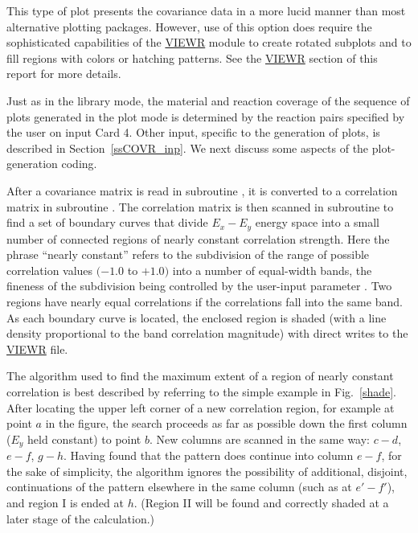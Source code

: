 This type of plot presents the covariance data in a more lucid manner
than most alternative plotting packages.  However, use of this option
does require the sophisticated capabilities of the
\hyperlink{sVIEWRhy}{VIEWR}
module to create rotated subplots and to fill regions with colors or
hatching patterns.  See the \hyperlink{sVIEWRhy}{VIEWR} section
of this report for more details.

Just as in the library mode, the material and reaction coverage of the
sequence of plots generated in the plot mode is determined by the
reaction pairs specified by the user on input Card 4.  Other input,
specific to the generation of plots, is described in Section~\ref{ssCOVR_inp}.
We next discuss some aspects of the plot-generation coding.

After a covariance matrix is read in subroutine
, it is
converted to a correlation matrix in subroutine
.  The
correlation matrix is then scanned in subroutine
 to find a set of boundary
curves that divide $E_{x} - E_{y}$ energy space into a small number of
connected regions of nearly constant correlation strength.  Here the
phrase ``nearly constant'' refers to the subdivision of the range of
possible correlation values $(-1.0$ to $+1.0)$ into a number of
equal-width bands, the fineness of the subdivision being controlled
by the user-input parameter .  Two regions have nearly
equal correlations if the correlations fall into the same band.  As
each boundary curve is located, the enclosed region is shaded (with a
line density proportional to the band correlation magnitude) with
direct writes to the \hyperlink{sVIEWRhy}{VIEWR} file.

The algorithm used to find the maximum extent of a region of nearly
constant correlation is best described by referring to the simple
example in Fig.~\ref{shade}.  After locating the upper left corner of a new
correlation region, for example at point $a$ in the figure, the search
proceeds as far as possible down the first column ($E_{y}$ held
constant) to point $b$.  New columns are scanned in the same way:
$c-d$, $e-f$, $g-h$.  Having found that the pattern does continue into
column $e-f$, for the sake of simplicity, the algorithm ignores the
possibility of additional, disjoint, continuations of the pattern
elsewhere in the same column (such as at $e'-f'$), and
region I is ended at $h$.  (Region II will be found and correctly
shaded at a later stage of the calculation.)

